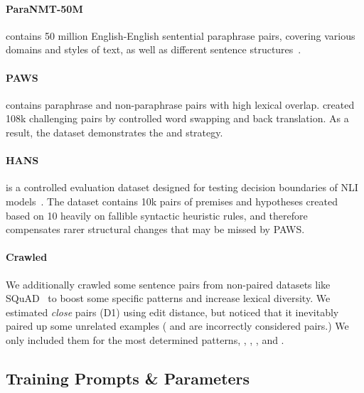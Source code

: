 \paragraph{ParaNMT-50M} contains 50 million English-English sentential paraphrase pairs, covering various domains and styles of text, as well as different sentence structures~\citet{wieting2017paranmt}. 

\paragraph{PAWS} contains paraphrase and non-paraphrase pairs with high lexical overlap. 
\citet{zhang2019paws} created 108k challenging pairs by controlled word swapping and back translation.
As a result, the dataset demonstrates the  and  strategy.


\paragraph{HANS} is a controlled evaluation dataset designed for testing decision boundaries of NLI models~\cite{mccoy2019right}. 
The dataset contains 10k pairs of premises and hypotheses created based on 10 heavily on fallible syntactic heuristic rules, and therefore compensates rarer structural changes that may be missed by PAWS.


\paragraph{Crawled} 
We additionally crawled some sentence pairs from non-paired datasets like SQuAD~\cite{rajpurkar-etal-2016-squad} to boost some specific patterns and increase lexical diversity. 
We estimated \emph{close} pairs (D1) using edit distance, but noticed that it inevitably paired up some unrelated examples (\eg {} and  are incorrectly considered  pairs.)
We only included them for the most determined patterns, \ie {}, , , and .


\subsection{Training Prompts \& Parameters}

